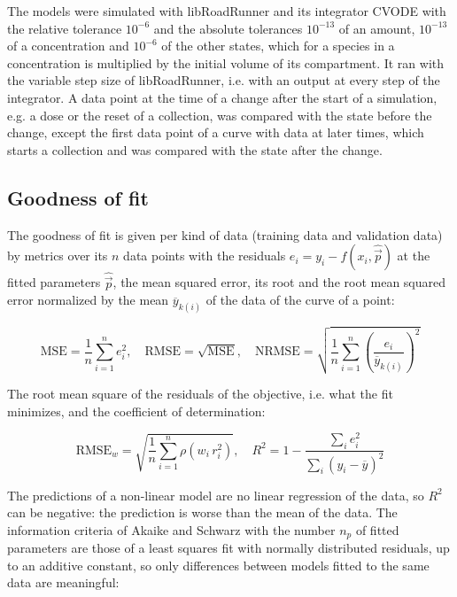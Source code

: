 \documentclass{article}
\begin{document}
The models were simulated with libRoadRunner \cite{Welsh2023} and its integrator CVODE \cite{Hindmarsh2005} with the relative tolerance $10^{-6}$ and the absolute tolerances $10^{-13}$ of an amount, $10^{-13}$ of a concentration and $10^{-6}$ of the other states, which for a species in a concentration is multiplied by the initial volume of its compartment. It ran with the variable step size of libRoadRunner, i.e. with an output at every step of the integrator. A data point at the time of a change after the start of a simulation, e.g. a dose or the reset of a collection, was compared with the state before the change, except the first data point of a curve with data at later times, which starts a collection and was compared with the state after the change.

\subsection{Goodness of fit}

The goodness of fit is given per kind of data (training data and validation data) by metrics over its $n$ data points with the residuals $e_i = y_i - f(x_i, \hat{\vec{p}})$ at the fitted parameters $\hat{\vec{p}}$, the mean squared error, its root and the root mean squared error normalized by the mean $\overline{y}_{k(i)}$ of the data of the curve of a point:

\begin{equation}
\mathrm{MSE} = \frac{1}{n} \sum_{i=1}^{n} e_i^2, \quad \mathrm{RMSE} = \sqrt{\mathrm{MSE}}, \quad \mathrm{NRMSE} = \sqrt{\frac{1}{n} \sum_{i=1}^{n} \left(\frac{e_i}{\overline{y}_{k(i)}}\right)^2}
\end{equation}

The root mean square of the residuals of the objective, i.e. what the fit minimizes, and the coefficient of determination:

\begin{equation}
\mathrm{RMSE}_w = \sqrt{\frac{1}{n} \sum_{i=1}^{n} \rho\left(w_i\, r_i^2\right)}, \quad R^2 = 1 - \frac{\sum_{i} e_i^2}{\sum_{i} \left(y_i - \overline{y}\right)^2}
\end{equation}

The predictions of a non-linear model are no linear regression of the data, so $R^2$ can be negative: the prediction is worse than the mean of the data. The information criteria of Akaike \cite{Akaike1974} and Schwarz \cite{Schwarz1978} with the number $n_p$ of fitted parameters are those of a least squares fit with normally distributed residuals, up to an additive constant, so only differences between models fitted to the same data are meaningful:
\end{document}
